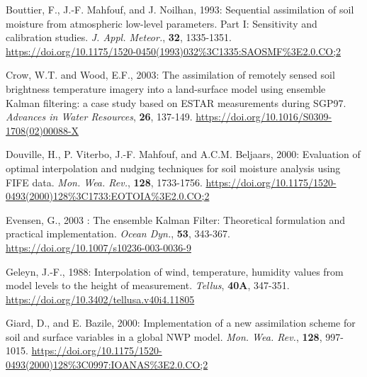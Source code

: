 \documentclass[12pt]{article}
\begin{document}
{{{\begin{description}
\item Bouttier, F., J.-F. Mahfouf, and J. Noilhan, 1993:
Sequential assimilation of soil moisture from atmospheric low-level parameters. Part I:
Sensitivity and calibration studies. {\it J. Appl. Meteor.}, {\bf 32}, 1335-1351.
\url{https://doi.org/10.1175/1520-0450(1993)032%3C1335:SAOSMF%3E2.0.CO;2}



\item Crow, W.T. and Wood, E.F., 2003: The assimilation of remotely sensed soil brightness temperature imagery into a land-surface model using ensemble Kalman filtering: a case study based on ESTAR measurements during SGP97. 
{\it Advances in Water Resources}, {\bf 26}, 137-149. \url{https://doi.org/10.1016/S0309-1708(02)00088-X} 

\item Douville, H., P. Viterbo, J.-F. Mahfouf, and A.C.M. Beljaars, 2000:
Evaluation of optimal interpolation and nudging techniques for soil moisture
analysis using FIFE data. {\it Mon. Wea. Rev.}, {\bf 128}, 1733-1756.
\url{https://doi.org/10.1175/1520-0493(2000)128\%3C1733:EOTOIA%3E2.0.CO;2}

\item Evensen, G., 2003 : The ensemble Kalman Filter: Theoretical formulation
and practical implementation. {\it Ocean Dyn.}, {\bf 53}, 343-367.
\url{https://doi.org/10.1007/s10236-003-0036-9}

\item Geleyn, J.-F., 1988: Interpolation of wind, temperature, humidity values
from model levels to the height of measurement. {\it Tellus}, {\bf 40A}, 347-351.
\url{https://doi.org/10.3402/tellusa.v40i4.11805}

\item Giard, D., and E. Bazile, 2000: Implementation of a new assimilation scheme
for soil and surface variables in a global NWP model. {\it Mon. Wea. Rev.},
{\bf 128}, 997-1015.
\url{https://doi.org/10.1175/1520-0493(2000)128\%3C0997:IOANAS\%3E2.0.CO;2}


\end{description}}}}
\end{document}
